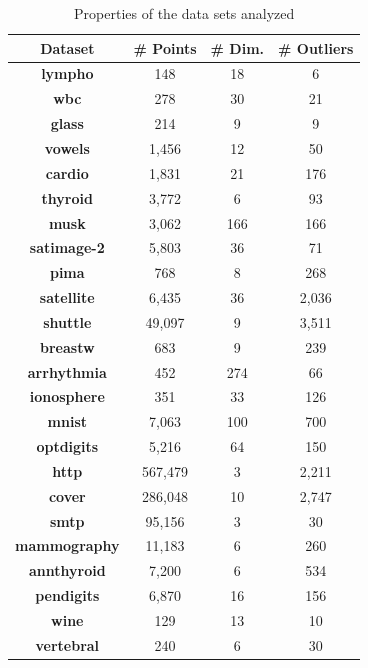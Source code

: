 \begin{small}
\begin{table}[!t]
\renewcommand{\arraystretch}{1.3}
\caption{Properties of the data sets analyzed}
\label{results:tbl-properties}
\centering
\begin{tabular}{|c|c|c|c|}
\hline
\bfseries Dataset & \bfseries \# Points & \bfseries \# Dim. & \bfseries \# Outliers \\ 
\hline
\bfseries lympho & 148 & 18 & 6 \\
\hline
\bfseries wbc & 278 & 30 & 21 \\
\hline
\bfseries glass & 214 & 9 & 9 \\
\hline
\bfseries vowels & 1,456 & 12 & 50 \\
\hline
\bfseries cardio & 1,831 & 21 & 176 \\
\hline
\bfseries thyroid & 3,772 & 6 & 93 \\
\hline
\bfseries musk & 3,062 & 166 & 166 \\
\hline
\bfseries satimage-2 & 5,803 & 36 & 71 \\
\hline
\bfseries pima & 768 & 8 & 268 \\
\hline
\bfseries satellite & 6,435 & 36 & 2,036 \\
\hline
\bfseries shuttle & 49,097 & 9 & 3,511 \\
\hline
\bfseries breastw & 683 & 9 & 239 \\
\hline
\bfseries arrhythmia & 452 & 274 & 66 \\
\hline
\bfseries ionosphere & 351 & 33 & 126 \\
\hline
\bfseries mnist & 7,063 & 100 & 700 \\
\hline
\bfseries optdigits & 5,216 & 64 & 150 \\
\hline
\bfseries http & 567,479 & 3 & 2,211 \\
\hline
\bfseries cover & 286,048 & 10 & 2,747 \\
\hline
\bfseries smtp & 95,156 & 3 & 30 \\
\hline
\bfseries mammography & 11,183 & 6 & 260 \\
\hline
\bfseries annthyroid & 7,200 & 6 & 534 \\
\hline
\bfseries pendigits & 6,870 & 16 & 156 \\
\hline
\bfseries wine & 129 & 13 & 10 \\
\hline
\bfseries vertebral & 240 & 6 & 30 \\
\hline
\end{tabular}
\label{description-table}
\end{table}
\end{small}


